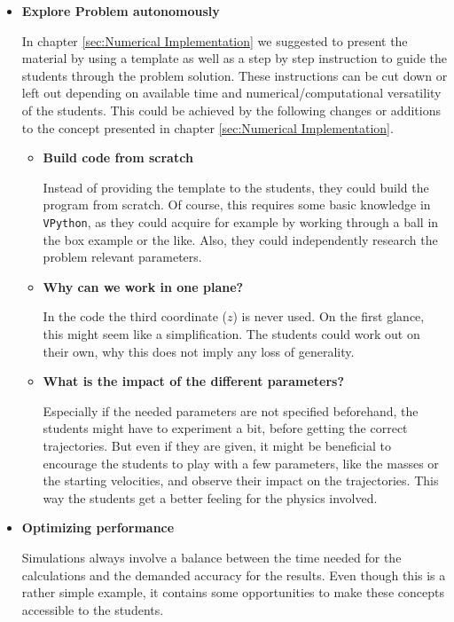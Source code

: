 \documentclass[12pt, UK english]{iopart}
\begin{document}
\begin{itemize}

\item \textbf{Explore Problem autonomously}

In chapter \ref{sec:Numerical Implementation} we suggested to present the material by using a template as well as a step by step instruction to guide the students through the problem solution.
These instructions can be cut down or left out depending on available time and numerical/computational versatility of the students.
This could be achieved by the following changes or additions to the concept presented in chapter \ref{sec:Numerical Implementation}.

\begin{itemize}
\item \textbf{Build code from scratch}

Instead of providing the template to the students, they could build the program from scratch.
Of course, this requires some basic knowledge in \texttt{VPython}, as they could acquire for example by working through a ball in the box example\cite{} or the like.
Also, they could independently research the problem relevant parameters.
\item \textbf{Why can we work in one plane?}

In the code the third coordinate ($z$) is never used.
On the first glance, this might seem like a simplification.
The students could work out on their own, why this does not imply any loss of generality.
\item \textbf{What is the impact of the different parameters?}

Especially if the needed parameters are not specified beforehand, the students might have to experiment a bit, before getting the correct trajectories.
But even if they are given, it might be beneficial to encourage the students to play with a few parameters, like the masses or the starting velocities, and observe their impact on the trajectories.
This way the students get a better feeling for the physics involved.
\end{itemize}

\item \textbf{Optimizing performance}

Simulations always involve a balance between the time needed for the calculations and the demanded accuracy for the results.
Even though this is a rather simple example, it contains some opportunities to make these concepts accessible to the students.


\end{itemize}
\end{document}
